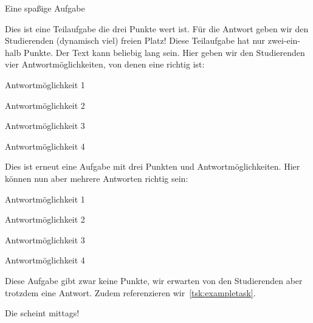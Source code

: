 \begin{Exercise}{Eine spaßige Aufgabe}
\begin{tasks}
    Dies ist eine Teilaufgabe die drei Punkte wert ist. Für die Antwort geben wir den Studierenden (dynamisch viel) freien Platz!
   \VerticalSpace
    \label{tsk:exampletask}Diese Teilaufgabe hat nur zwei-ein-halb Punkte. Der Text kann beliebig lang sein. Hier geben wir den Studierenden vier Antwortmöglichkeiten, von denen eine richtig ist:
   \begin{radioboxes}
      \item Antwortmöglichkeit 1
      \item Antwortmöglichkeit 2
      \item Antwortmöglichkeit 3
      \item Antwortmöglichkeit 4
   \end{radioboxes}
    Dies ist erneut eine Aufgabe mit drei Punkten und Antwortmöglichkeiten. Hier können nun aber mehrere Antworten richtig sein:
   \begin{checkboxes}
      \item Antwortmöglichkeit 1
      \item Antwortmöglichkeit 2
      \item Antwortmöglichkeit 3
      \item Antwortmöglichkeit 4
   \end{checkboxes}
    Diese Aufgabe gibt zwar keine Punkte, wir erwarten von den Studierenden aber trotzdem eine Antwort. Zudem referenzieren wir~\autoref{tsk:exampletask}.

   Die  scheint mittags!
   \qquad\strut
\end{tasks}
\end{Exercise}